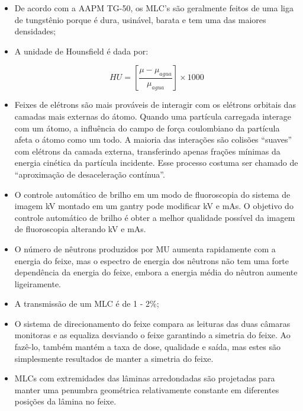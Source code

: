 \documentclass[11pt,a4paper]{article}
\newcounter{exemplo}
\begin{document}
\begin{exemplo}[Física]
\begin{itemize}
        \item De acordo com a AAPM TG-50, os MLC's são geralmente feitos de uma liga de tungstênio porque é dura, usinável, barata e tem uma das maiores densidades;
        
        \item A unidade de Hounsfield é dada por:
        
            \begin{equation*}
                HU = \left[\frac{\mu - \mu_{agua}}{\mu_{agua}}\right] \times 1000
            \end{equation*}
        \item Feixes de elétrons são mais prováveis de interagir com os elétrons orbitais das camadas mais externas do átomo. Quando uma partícula carregada interage com um átomo, a influência do campo de força coulombiano da partícula afeta o átomo como um todo. A maioria das interações são colisões “suaves” com elétrons da camada externa, transferindo apenas frações mínimas da energia cinética da partícula incidente. Esse processo costuma ser chamado de “aproximação de desaceleração contínua”.
        
        \item O controle automático de brilho em um modo de fluoroscopia do sistema de imagem kV montado em um gantry pode modificar kV e mAs. O objetivo do controle automático de brilho é obter a melhor qualidade possível da imagem de fluoroscopia alterando kV e mAs.
        
        \item O número de nêutrons produzidos por MU aumenta rapidamente com a energia do feixe, mas o espectro de energia dos nêutrons não tem uma forte dependência da energia do feixe, embora a energia média do nêutron aumente ligeiramente.
        
        \item A transmissão de um MLC é de 1 - 2\%; 
        
        \item O sistema de direcionamento do feixe compara as leituras das duas câmaras monitoras e as equaliza desviando o feixe garantindo a simetria do feixe. Ao fazê-lo, também mantém a taxa de dose, qualidade e saída, mas estes são simplesmente resultados de manter a simetria do feixe.
        
        \item MLCs com extremidades das lâminas arredondadas são projetadas para manter uma penumbra geométrica relativamente constante em diferentes posições da lâmina no feixe.
        

\end{itemize}
\end{exemplo}
\end{document}
